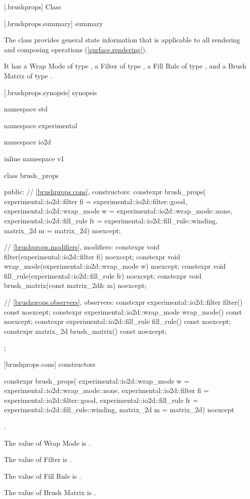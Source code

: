 
 [\iotwod.brushprops] {Class }

 [\iotwod.brushprops.summary] { summary}

\pnum
{}%
The  class provides general state information that is applicable to all rendering and composing operations (\ref{surface.rendering}).

\pnum
It has a Wrap Mode of type , a Filter of type , a Fill Rule of type , and a Brush Matrix of type .

 [\iotwod.brushprops.synopsis] { synopsis}

\begin{codeblock}
namespace std { namespace experimental { namespace io2d { inline namespace v1 {
  class brush_props {
  public:
    // \ref{brushprops.cons}, constructors:
    constexpr brush_props(
      experimental::io2d::filter fi = experimental::io2d::filter::good,
      experimental::io2d::wrap_mode w = experimental::io2d::wrap_mode::none,
      experimental::io2d::fill_rule fr = experimental::io2d::fill_rule::winding,
      matrix_2d m = matrix_2d{}) noexcept;

    // \ref{brushprops.modifiers}, modifiers:
    constexpr void filter(experimental::io2d::filter fi) noexcept;
    constexpr void wrap_mode(experimental::io2d::wrap_mode w) noexcept;
    constexpr void fill_rule(experimental::io2d::fill_rule fr) noexcept;
    constexpr void brush_matrix(const matrix_2d& m) noexcept;

    // \ref{brushprops.observers}, observers:
    constexpr experimental::io2d::filter filter() const noexcept;
    constexpr experimental::io2d::wrap_mode wrap_mode() const noexcept;
    constexpr experimental::io2d::fill_rule fill_rule() const noexcept;
    constexpr matrix_2d brush_matrix() const noexcept;
  };
}}}}
\end{codeblock}

 [brushprops.cons] { constructors}

\begin{itemdecl}
constexpr brush_props(
  experimental::io2d::wrap_mode w = experimental::io2d::wrap_mode::none,
  experimental::io2d::filter fi = experimental::io2d::filter::good,
  experimental::io2d::fill_rule fr = experimental::io2d::fill_rule::winding,
  matrix_2d m = matrix_2d{}) noexcept    
\end{itemdecl}
\begin{itemdescr}
\onecolumn
\requires
{}.

\pnum
\effects
The value of Wrap Mode is .

\pnum
The value of Filter is .

\pnum
The value of Fill Rule is .

\pnum
The value of Brush Matrix is .
\end{itemdescr}

